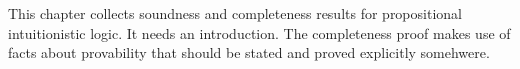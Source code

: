 \documentclass[../../../include/open-logic-chapter]{subfiles}
\begin{document}

\begin{editorial}
  This chapter collects soundness and completeness results for
  propositional intuitionistic logic. It needs an introduction. The
  completeness proof makes use of facts about provability that should
  be stated and proved explicitly somehwere.
\end{editorial}


\OLEndChapterHook
\end{document}
